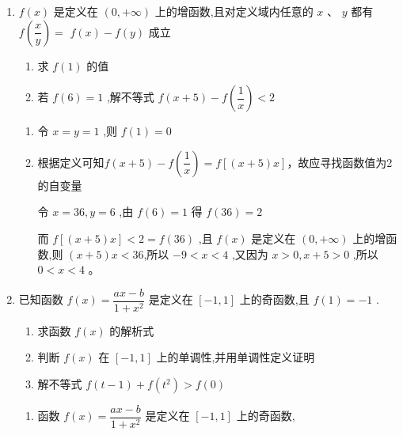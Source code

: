\begin{enumerate}
\begin{jieda}
    \end{jieda}
    
    \item $f\left( x\right)$ 是定义在 $\left( {0, + \infty }\right)$ 上的增函数,且对定义域内任意的 $x\text{ 、 }y$ 都有 $f\left( \dfrac{x}{y}\right)  =$  $f\left( x\right)  - f\left( y\right)$ 成立
    \begin{enumerate}
        \item 求 $f\left( 1\right)$ 的值
        \item 若 $f\left( 6\right)  = 1$ ,解不等式 $f\left( {x + 5}\right)  - f\left( \dfrac{1}{x}\right)  < 2$ 
    \end{enumerate}
    \begin{jieda}
        \begin{enumerate}
            \item 令 $x = y = 1$ ,则 $f\left( 1\right)  = 0$ 
            \item 
            根据定义可知$f\left( {x + 5}\right)  - f\left( \dfrac{1}{x}\right)  = f\left\lbrack  {\left( {x + 5}\right) x}\right\rbrack$，故应寻找函数值为2的自变量

            
            令 $x = {36},y = 6$ ,由 $f\left( 6\right)  = 1$ 得 $f\left( {36}\right)  = 2$
            
            而 $f\left\lbrack  {\left( {x + 5}\right) x}\right\rbrack  < 2 = f\left( {36}\right)$ ,且 $f\left( x\right)$ 是定义在 $\left( {0, + \infty }\right)$ 上的增函数,则 $\left( {x + 5}\right) x < 36$,所以 $- 9 < x < 4$ ,又因为 $x > 0,x + 5 > 0$ ,所以 $0 < x < 4$ 。
        \end{enumerate}        
    \end{jieda}
    
    \item  已知函数 $f\left( x\right)  = \dfrac{{ax} - b}{1 + {x}^{2}}$ 是定义在 $\left\lbrack  {-1,1}\right\rbrack$ 上的奇函数,且 $f\left( 1\right)  =  - 1$ .
    \begin{enumerate}
        \item 求函数 $f\left( x\right)$ 的解析式
        \item 判断 $f\left( x\right)$ 在 $\left\lbrack  {-1,1}\right\rbrack$ 上的单调性,并用单调性定义证明
        \item 解不等式 $f\left( {t - 1}\right)  + f\left( {t}^{2}\right)  > f\left( 0\right)$
    \end{enumerate}
    \begin{jieda}
        \begin{enumerate}
            \item 函数 $f\left( x\right)  = \dfrac{{ax} - b}{1 + {x}^{2}}$ 是定义在 $\left\lbrack  {-1,1}\right\rbrack$ 上的奇函数,
            

\end{enumerate}
\end{jieda}
\end{enumerate}
